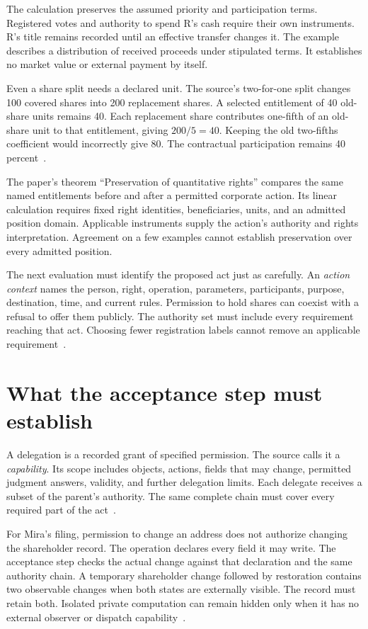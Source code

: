 \documentclass{momentum}
\begin{document}
The calculation preserves the assumed priority and participation terms.
Registered votes and authority to spend R's cash require their own instruments.
R's title remains recorded until an effective transfer changes it.
The example describes a distribution of received proceeds under stipulated terms.
It establishes no market value or external payment by itself.

Even a share split needs a declared unit.
The source's two-for-one split changes 100 covered shares into 200 replacement shares.
A selected entitlement of 40 old-share units remains 40.
Each replacement share contributes one-fifth of an old-share unit to that entitlement, giving \(200/5=40\).
Keeping the old two-fifths coefficient would incorrectly give 80.
The contractual participation remains 40 percent~\cite[Section~2, ``A split with retained participation'']{entity}.

The paper's theorem ``Preservation of quantitative rights'' compares the same named entitlements before and after a permitted corporate action.
Its linear calculation requires fixed right identities, beneficiaries, units, and an admitted position domain.
Applicable instruments supply the action's authority and rights interpretation.
Agreement on a few examples cannot establish preservation over every admitted position.

The next evaluation must identify the proposed act just as carefully.
An \emph{action context} names the person, right, operation, parameters, participants, purpose, destination, time, and current rules.
Permission to hold shares can coexist with a refusal to offer them publicly.
The authority set must include every requirement reaching that act.
Choosing fewer registration labels cannot remove an applicable requirement~\cite[Section~2, ``Scoped action'']{entity}.

\section{What the acceptance step must establish}
\label{sec:acceptance}

A delegation is a recorded grant of specified permission.
The source calls it a \emph{capability}.
Its scope includes objects, actions, fields that may change, permitted judgment answers, validity, and further delegation limits.
Each delegate receives a subset of the parent's authority.
The same complete chain must cover every required part of the act~\cite[Section~3.1]{institutions}.

For Mira's filing, permission to change an address does not authorize changing the shareholder record.
The operation declares every field it may write.
The acceptance step checks the actual change against that declaration and the same authority chain.
A temporary shareholder change followed by restoration contains two observable changes when both states are externally visible.
The record must retain both.
Isolated private computation can remain hidden only when it has no external observer or dispatch capability~\cite[Section~3.3 and Section~4, Corollary~1]{institutions}.
\end{document}
